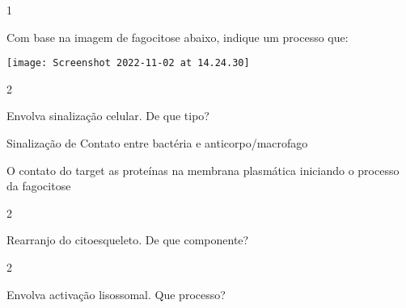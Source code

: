 \documentclass[\mainfilename]{subfiles}
\begin{document}
\begin{questionBox}1{} %

    Com base na imagem de fagocitose abaixo, indique um processo que:

    \begin{center}
        \texttt{[image: Screenshot 2022-11-02 at 14.24.30]}
    \end{center}

\end{questionBox}

\begin{questionBox}2{} %

    Envolva sinalização celular. De que tipo?

    \begin{answerBox}{} %
        Sinalização de Contato entre bactéria e anticorpo/macrofago

        O contato do target as proteínas na membrana plasmática iniciando o processo da fagocitose
    \end{answerBox}

\end{questionBox}

\begin{questionBox}2{} %

    Rearranjo do citoesqueleto. De que componente?
    

\end{questionBox}

\begin{questionBox}2{} %
    
    Envolva activação lisossomal. Que processo?

\end{questionBox}
\end{document}
